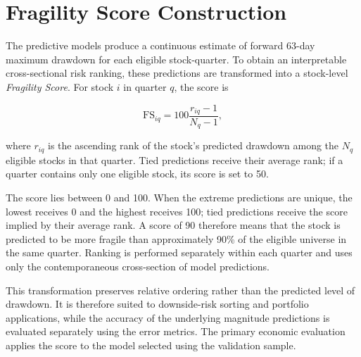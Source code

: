 \section{Fragility Score Construction}
\label{sec:fragility_score_construction}

The predictive models produce a continuous estimate of forward 63-day maximum drawdown for each eligible stock-quarter. To obtain an interpretable cross-sectional risk ranking, these predictions are transformed into a stock-level \emph{Fragility Score}. For stock $i$ in quarter $q$, the score is

\begin{equation}
    \mathrm{FS}_{iq}
    = 100\frac{r_{iq}-1}{N_q-1},
    \label{eq:fragility_score}
\end{equation}

\noindent
where $r_{iq}$ is the ascending rank of the stock's predicted drawdown among the $N_q$ eligible stocks in that quarter. Tied predictions receive their average rank; if a quarter contains only one eligible stock, its score is set to 50.

The score lies between 0 and 100. When the extreme predictions are unique, the lowest receives 0 and the highest receives 100; tied predictions receive the score implied by their average rank. A score of 90 therefore means that the stock is predicted to be more fragile than approximately 90\% of the eligible universe in the same quarter. Ranking is performed separately within each quarter and uses only the contemporaneous cross-section of model predictions.

This transformation preserves relative ordering rather than the predicted level of drawdown. It is therefore suited to downside-risk sorting and portfolio applications, while the accuracy of the underlying magnitude predictions is evaluated separately using the error metrics. The primary economic evaluation applies the score to the model selected using the validation sample.
